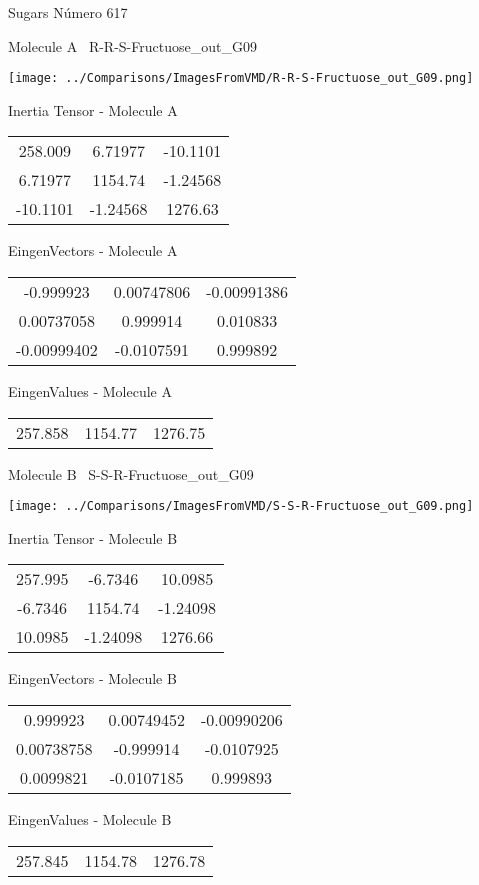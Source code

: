 \vtab[-3cm]
\begin{center}
{\large Sugars \tab Número 617}
\end{center}
\begin{multicols}{2}
\begin{center}

Molecule A \
R-R-S-Fructuose\_out\_G09

\texttt{[image: ../Comparisons/ImagesFromVMD/R-R-S-Fructuose\_out\_G09.png]}

Inertia Tensor - Molecule A \\
\begin{tabular}{|c c c|}
258.009	 & 	6.71977	 & 	-10.1101	 \\
6.71977	 & 	1154.74	 & 	-1.24568	 \\
-10.1101	 & 	-1.24568	 & 	1276.63
\end{tabular}

\vtab
 EingenVectors - Molecule A     \\
\begin{tabular}{|c c c|}
-0.999923	 & 	0.00747806	 & 	-0.00991386	 \\
0.00737058	 & 	0.999914	 & 	0.010833	 \\
-0.00999402	 & 	-0.0107591	 & 	0.999892
\end{tabular}

\vtab
 EingenValues - Molecule A     \\
\begin{tabular}{|c c c|}
257.858	 & 	1154.77	 & 	1276.75	 \\
\end{tabular}
\columnbreak

Molecule B \
S-S-R-Fructuose\_out\_G09

\texttt{[image: ../Comparisons/ImagesFromVMD/S-S-R-Fructuose\_out\_G09.png]}

Inertia Tensor - Molecule B \\
\begin{tabular}{|c c c|}
257.995	 & 	-6.7346	 & 	10.0985	 \\
-6.7346	 & 	1154.74	 & 	-1.24098	 \\
10.0985	 & 	-1.24098	 & 	1276.66
\end{tabular}

\vtab
 EingenVectors - Molecule B     \\
\begin{tabular}{|c c c|}
0.999923	 & 	0.00749452	 & 	-0.00990206	 \\
0.00738758	 & 	-0.999914	 & 	-0.0107925	 \\
0.0099821	 & 	-0.0107185	 & 	0.999893
\end{tabular}

\vtab
 EingenValues - Molecule B     \\
\begin{tabular}{|c c c|}
257.845	 & 	1154.78	 & 	1276.78	 \\
\end{tabular}

\end{center}
\end{multicols}

